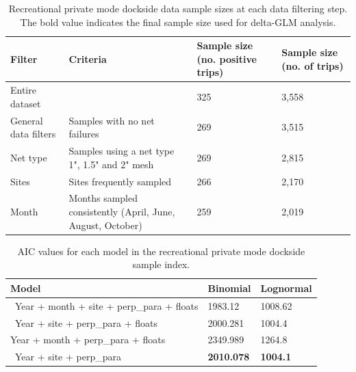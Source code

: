 \documentclass[12pt,]{article}
\begin{document}
\begin{table}[ht]
\centering
\caption{Recreational private mode dockside data sample 
                                          sizes at each data filtering step.  
                                          The bold value indicates the final sample size 
                                          used for delta-GLM analysis.} 
\label{tab:Fleet9_GillnetSurvey_filter}
\begin{tabular}{>{\raggedright}p{1.5in}>{\raggedright}p{2.6in}>{\raggedright}p{1in}>{\raggedright}p{1in}}
  \hline
Filter & Criteria & Sample size (no. positive trips) & Sample size (no. of trips) \\ 
  \hline
Entire dataset &  & 325 & 3,558 \\ 
  General data filters & Samples with  no net failures & 269 & 3,515 \\ 
  Net type & Samples using a net type 1", 1.5" and 2" mesh & 269 & 2,815 \\ 
  Sites & Sites frequently sampled & 266 & 2,170 \\ 
  Month & Months sampled consistently (April, June, August, October) & 259 & 2,019 \\ 
   \hline
\end{tabular}
\end{table}\vspace{2in}

\begin{table}[ht]
\centering
\caption{AIC values for each model in the
                                          recreational private mode dockside sample 
                                          index.} 
\label{tab:Fleet9_GillnetSurvey_aic}
\begin{tabular}{lll}
  \hline
Model & Binomial & Lognormal \\ 
  \hline
~Year + month + site + perp\_para + floats & 1983.12 & 1008.62 \\ 
  ~Year + site + perp\_para  + floats & 2000.281 & 1004.4 \\ 
   Year + month  + perp\_para + floats & 2349.989 & 1264.8 \\ 
  ~Year  + site +  perp\_para & \textbf{2010.078} & \textbf{1004.1} \\ 
   \hline
\end{tabular}
\end{table}\vspace{2in}
\end{document}
